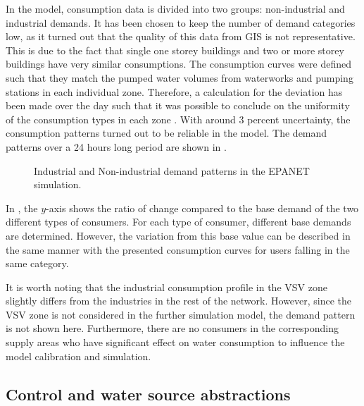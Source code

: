 In the model, consumption data is divided into two groups: non-industrial and industrial demands. It has been chosen to keep the number of demand categories low, as it turned out that the quality of this data from GIS is not representative. This is due to the fact that single one storey buildings and two or more storey buildings have very similar consumptions. The consumption curves were defined such that they match the pumped water volumes from waterworks and pumping stations in each individual zone. Therefore, a calculation for the deviation has been made over the day such that it was possible to conclude on the uniformity of the consumption types in each zone \cite{verdo_doc}. With around 3 percent uncertainty, the consumption patterns turned out to be reliable in the model. The demand patterns over a 24 hours long period are shown in  .

\begin{figure}[H]
\centering

\caption{Industrial and Non-industrial demand patterns in the EPANET simulation.}
\label{fig:demandpatterns_EPANET}
\end{figure}

\vspace{-3mm}

In , the $y$-axis shows the ratio of change compared to the base demand of the two different types of consumers. For each type of consumer, different base demands are determined. However, the variation from this base value can be described in the same manner with the presented consumption curves for users falling in the same category. 

It is worth noting that the industrial consumption profile in the VSV zone slightly differs from the industries in the rest of the network. However, since the VSV zone is not considered in the further simulation model, the demand pattern is not shown here. Furthermore, there are no consumers in the corresponding supply areas who have  significant effect on water consumption to influence the model calibration and simulation. 

\subsection{Control and water source abstractions}
\label{control_and_water_source_abstractions}

